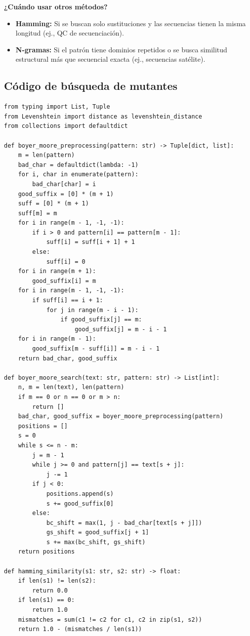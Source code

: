 \documentclass[fleqn,10pt]{article}
\begin{document}
\textbf{¿Cuándo usar otros métodos?}
\begin{itemize}
    \item \textbf{Hamming:} Si se buscan solo sustituciones y las secuencias tienen la misma longitud (ej., QC de secuenciación).
    \item \textbf{N-gramas:} Si el patrón tiene dominios repetidos o se busca similitud estructural más que secuencial exacta (ej., secuencias satélite).
\end{itemize}

\subsection{Código de búsqueda de mutantes}
\begin{lstlisting}[style=pythonstyle, caption={Búsqueda de mutantes con similitud}]
from typing import List, Tuple
from Levenshtein import distance as levenshtein_distance
from collections import defaultdict

def boyer_moore_preprocessing(pattern: str) -> Tuple[dict, list]:
    m = len(pattern)
    bad_char = defaultdict(lambda: -1)
    for i, char in enumerate(pattern):
        bad_char[char] = i
    good_suffix = [0] * (m + 1)
    suff = [0] * (m + 1)
    suff[m] = m
    for i in range(m - 1, -1, -1):
        if i > 0 and pattern[i] == pattern[m - 1]:
            suff[i] = suff[i + 1] + 1
        else:
            suff[i] = 0
    for i in range(m + 1):
        good_suffix[i] = m
    for i in range(m - 1, -1, -1):
        if suff[i] == i + 1:
            for j in range(m - i - 1):
                if good_suffix[j] == m:
                    good_suffix[j] = m - i - 1
    for i in range(m - 1):
        good_suffix[m - suff[i]] = m - i - 1
    return bad_char, good_suffix

def boyer_moore_search(text: str, pattern: str) -> List[int]:
    n, m = len(text), len(pattern)
    if m == 0 or n == 0 or m > n:
        return []
    bad_char, good_suffix = boyer_moore_preprocessing(pattern)
    positions = []
    s = 0
    while s <= n - m:
        j = m - 1
        while j >= 0 and pattern[j] == text[s + j]:
            j -= 1
        if j < 0:
            positions.append(s)
            s += good_suffix[0]
        else:
            bc_shift = max(1, j - bad_char[text[s + j]])
            gs_shift = good_suffix[j + 1]
            s += max(bc_shift, gs_shift)
    return positions

def hamming_similarity(s1: str, s2: str) -> float:
    if len(s1) != len(s2):
        return 0.0
    if len(s1) == 0:
        return 1.0
    mismatches = sum(c1 != c2 for c1, c2 in zip(s1, s2))
    return 1.0 - (mismatches / len(s1))


\end{lstlisting}
\end{document}
